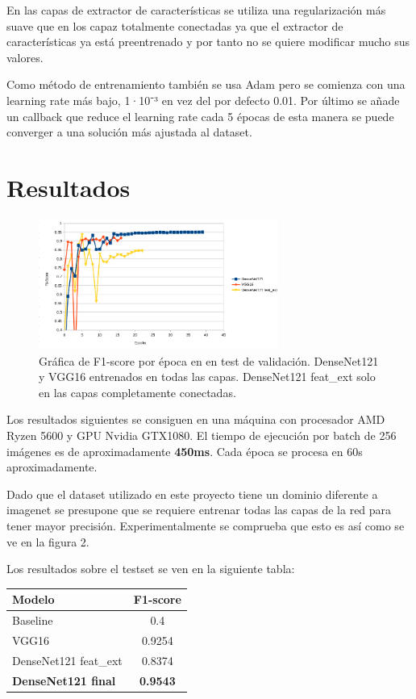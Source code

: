 \documentclass[12pt]{article}
\begin{document}
    En las capas de extractor de características se utiliza una regularización más suave que en los capaz totalmente
    conectadas ya que el extractor de características ya está preentrenado y por tanto no se quiere modificar mucho
    sus valores.

    Como método de entrenamiento también se usa Adam pero se comienza con una learning rate más bajo, 1·10⁻³ en vez
    del por defecto 0.01.
    Por último se añade un callback que reduce el learning rate cada 5 épocas de esta manera se puede converger a una
    solución más ajustada al dataset.


    \newpage
    \section{Resultados}

    \begin{figure}[h]
        \centering
        \includegraphics[width=0.7\textwidth]{graph_result}
        \caption{Gráfica de F1-score por época en en test de validación. DenseNet121 y VGG16 entrenados en todas las
        capas.
        DenseNet121 feat\_ext solo en las capas completamente conectadas.}\label{fig:figure2}
    \end{figure}

    Los resultados siguientes se consiguen en una máquina con procesador AMD Ryzen 5600 y GPU Nvidia GTX1080.
    El tiempo de ejecución por batch de 256 imágenes es de aproximadamente \textbf{450ms}. Cada época se procesa en
    60s aproximadamente.

    Dado que el dataset utilizado en este proyecto tiene un dominio diferente a imagenet se presupone que se requiere
    entrenar todas las capas de la red para tener mayor precisión.
    Experimentalmente se comprueba que esto es así como se ve en la figura 2.



    Los resultados sobre el testset se ven en la siguiente tabla:
    \begin{center}
        \begin{tabular}{||l | c||}
            \hline
            Modelo & F1-score \\ [0.5ex]
            \hline\hline
            Baseline & 0.4 \\
            \hline
            VGG16 & 0.9254 \\
            \hline
            DenseNet121 feat\_ext & 0.8374 \\
            \hline
            \textbf{DenseNet121  final} & \textbf{0.9543} \\
            \hline
        \end{tabular}
    \end{center}
\end{document}

